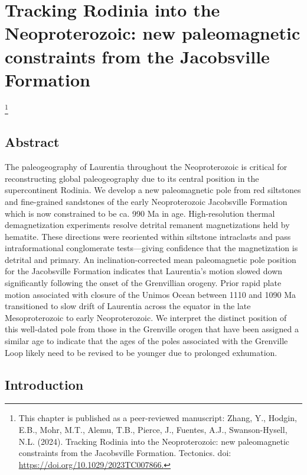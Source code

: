 \chapter[Tracking Rodinia into the Neoproterozoic: new paleomagnetic constraints from the Jacobsville Formation][Tracking Rodinia into the Neoproterozoic]{Tracking Rodinia into the Neoproterozoic: new paleomagnetic constraints from the Jacobsville Formation}

\let\thefootnote\relax\footnote{This chapter is published as a peer-reviewed manuscript: Zhang, Y., Hodgin, E.B., Mohr, M.T., Alemu, T.B., Pierce, J., Fuentes, A.J., Swanson-Hysell, N.L. (2024). Tracking Rodinia into the Neoproterozoic: new paleomagnetic constraints from the Jacobsville Formation. Tectonics. doi: \url{https://doi.org/10.1029/2023TC007866.}}

\section{Abstract}
The paleogeography of Laurentia throughout the Neoproterozoic is critical for reconstructing global paleogeography due to its central position in the supercontinent Rodinia. We develop a new paleomagnetic pole from red siltstones and fine-grained sandstones of the early Neoproterozoic Jacobsville Formation which is now constrained to be ca. 990 Ma in age. High-resolution thermal demagnetization experiments resolve detrital remanent magnetizations held by hematite. These directions were reoriented within siltstone intraclasts and pass intraformational conglomerate tests---giving confidence that the magnetization is detrital and primary. An inclination-corrected mean paleomagnetic pole position for the Jacobsville Formation indicates that Laurentia's motion slowed down significantly following the onset of the Grenvillian orogeny. Prior rapid plate motion associated with closure of the Unimos Ocean between 1110 and 1090 Ma transitioned to slow drift of Laurentia across the equator in the late Mesoproterozoic to early Neoproterozoic. We interpret the distinct position of this well-dated pole from those in the Grenville orogen that have been assigned a similar age to indicate that the ages of the poles associated with the Grenville Loop likely need to be revised to be younger due to prolonged exhumation. 

\section{Introduction}

